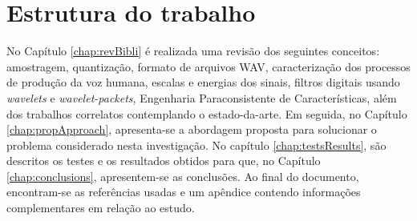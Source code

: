 	\section{Estrutura do trabalho}
		\par No Capítulo \ref{chap:revBibli} é realizada uma revisão dos seguintes conceitos: amostragem, quantização, formato de arquivos WAV, caracterização dos processos de produção da voz humana, escalas e energias dos sinais, filtros digitais usando \textit{wavelets} e \textit{wavelet-packets}, Engenharia Paraconsistente de Características, além dos trabalhos correlatos contemplando o estado-da-arte. Em seguida, no Capítulo \ref{chap:propApproach}, apresenta-se a abordagem proposta para solucionar o problema considerado nesta investigação. No capítulo \ref{chap:testsResults}, são descritos os testes e os resultados obtidos para que, no Capítulo \ref{chap:conclusions}, apresentem-se as conclusões. Ao final do documento, encontram-se as referências usadas e um apêndice contendo informações complementares em relação ao estudo.
		\disableClearpage